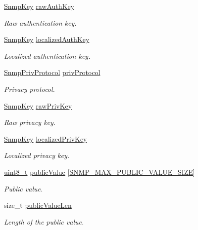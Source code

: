 \begin{DoxyCompactItemize}
\hyperlink{structSnmpKey}{Snmp\+Key} \hyperlink{structSnmpUserEntry_a32003a1f649e6244a8453157d6502f92}{raw\+Auth\+Key}
\begin{DoxyCompactList}\small\item\em Raw authentication key. \end{DoxyCompactList}\item 
\hyperlink{structSnmpKey}{Snmp\+Key} \hyperlink{structSnmpUserEntry_abe989af09e827849ce740a3813edcbc7}{localized\+Auth\+Key}
\begin{DoxyCompactList}\small\item\em Localized authentication key. \end{DoxyCompactList}\item 
\hyperlink{snmp__agent__usm_8h_acfd97e4fdb0cd081855bcb3d922dd851}{Snmp\+Priv\+Protocol} \hyperlink{structSnmpUserEntry_a59bfb353ffa70a6791f0a6d5608ec0eb}{priv\+Protocol}
\begin{DoxyCompactList}\small\item\em Privacy protocol. \end{DoxyCompactList}\item 
\hyperlink{structSnmpKey}{Snmp\+Key} \hyperlink{structSnmpUserEntry_ac4445ac274e1da56ffb5c037c9f9cb46}{raw\+Priv\+Key}
\begin{DoxyCompactList}\small\item\em Raw privacy key. \end{DoxyCompactList}\item 
\hyperlink{structSnmpKey}{Snmp\+Key} \hyperlink{structSnmpUserEntry_aee3ff1ac4b61b242440a14543c06bef2}{localized\+Priv\+Key}
\begin{DoxyCompactList}\small\item\em Localized privacy key. \end{DoxyCompactList}\item 
\hyperlink{stdint_8h_aba7bc1797add20fe3efdf37ced1182c5}{uint8\+\_\+t} \hyperlink{structSnmpUserEntry_a40f5fdae184968aea77b0c816f341c8e}{public\+Value} \mbox{[}\hyperlink{snmp__common_8h_aa26659028607a40bdde3f48bb7e603e3}{S\+N\+M\+P\+\_\+\+M\+A\+X\+\_\+\+P\+U\+B\+L\+I\+C\+\_\+\+V\+A\+L\+U\+E\+\_\+\+S\+I\+ZE}\mbox{]}
\begin{DoxyCompactList}\small\item\em Public value. \end{DoxyCompactList}\item 
size\+\_\+t \hyperlink{structSnmpUserEntry_a5b818085df903f1065013380308c3777}{public\+Value\+Len}
\begin{DoxyCompactList}\small\item\em Length of the public value. \end{DoxyCompactList}\end{DoxyCompactItemize}


